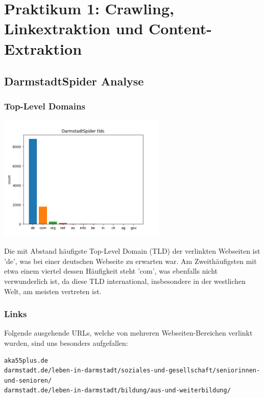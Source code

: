 \newpage
\section{Praktikum 1: Crawling, Linkextraktion und Content-Extraktion}

\subsection{DarmstadtSpider Analyse}

\subsubsection*{Top-Level Domains}

\begin{center}
	\includegraphics[width=0.6\textwidth]{images/DarmstadtSpiderTLDs.png}
\end{center}

\noindent Die mit Abstand häufigste Top-Level Domain (TLD) der verlinkten Webseiten ist 'de', was bei einer deutschen Webseite zu erwarten war. Am Zweithäufigsten mit etwa einem viertel dessen Häufigkeit steht 'com', was ebenfalls nicht verwunderlich ist, da diese TLD international, insbesondere in der westlichen Welt, am meisten vertreten ist.

\subsubsection*{Links}

Folgende ausgehende URLs, welche von mehreren Webseiten-Bereichen verlinkt wurden, sind uns besonders aufgefallen:

{\color{MidnightBlue}
\begin{lstlisting}
aka55plus.de
darmstadt.de/leben-in-darmstadt/soziales-und-gesellschaft/seniorinnen-und-senioren/
darmstadt.de/leben-in-darmstadt/bildung/aus-und-weiterbildung/
\end{lstlisting}}

